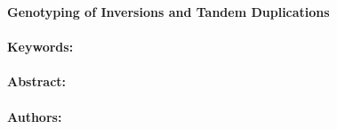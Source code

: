 \noindent
\large {\bf Genotyping of Inversions and Tandem Duplications} 


\normalsize 


\noindent \paragraph{Keywords:} 

\noindent \paragraph{Abstract:} 



\noindent \paragraph{Authors:} 

